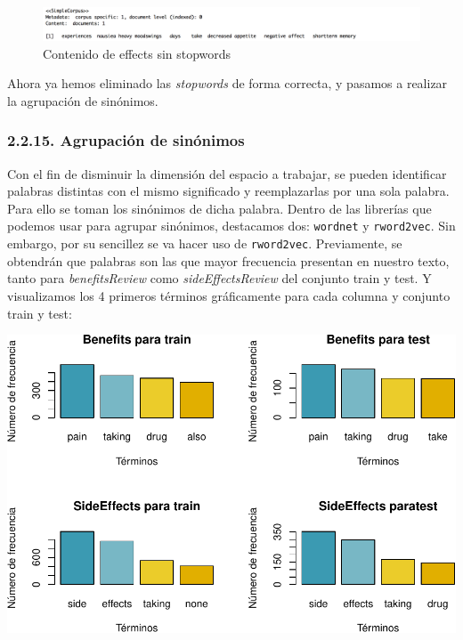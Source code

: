 \documentclass[spanish,]{article}
\begin{document}
\begin{figure}[h]
    \centering
    \includegraphics[width=1\textwidth]{imagenes/effects_stopwords.png}
    \caption{Contenido de effects sin stopwords}
    \label{benefits2}
\end{figure}

Ahora ya hemos eliminado las \emph{stopwords} de forma correcta, y
pasamos a realizar la agrupación de sinónimos.

\subsubsection{2.2.15. Agrupación de
sinónimos}\label{agrupacion-de-sinonimos}

Con el fin de disminuir la dimensión del espacio a trabajar, se pueden
identificar palabras distintas con el mismo significado y reemplazarlas
por una sola palabra. Para ello se toman los sinónimos de dicha palabra.
Dentro de las librerías que podemos usar para agrupar sinónimos,
destacamos dos: \texttt{wordnet} y \texttt{rword2vec}. Sin embargo, por
su sencillez se va hacer uso de \texttt{rword2vec}. Previamente, se
obtendrán que palabras son las que mayor frecuencia presentan en nuestro
texto, tanto para \emph{benefitsReview} como \emph{sideEffectsReview}
del conjunto train y test. Y visualizamos los 4 primeros términos
gráficamente para cada columna y conjunto train y test:

\includegraphics{practica-original_files/figure-latex/unnamed-chunk-41-1.pdf}
\end{document}
